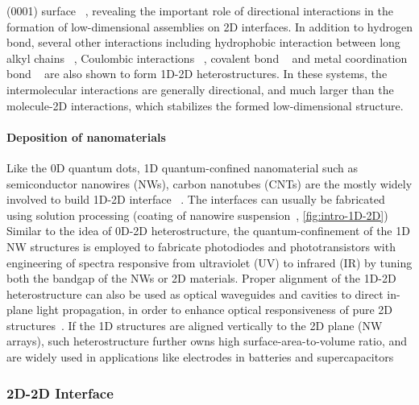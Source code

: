 (0001) surface
~\autocite{Meier_2010_polycyclic_gr,Roos_2011_BTP_gr,Roos_2011_hiera_org_gr},
revealing the important role of directional interactions in the
formation of low-dimensional assemblies on 2D
interfaces.
%
In addition to hydrogen bond, several other interactions including
hydrophobic interaction between long alkyl chains
~\autocite{De_Feyter_2003_2D_assem_rev, Deshpande_2012_1D_assemb_gr},
Coulombic interactions ~\autocite{Prado_2011_2D_acid_gr}, covalent bond
~\autocite{Colson_2011_2DMOF_gr,Colson_2014_2D_COF_gr} and metal
coordination bond ~\autocite{Urgel_2015_MOF_BN} are also shown to form
1D-2D heterostructures. In these systems, the intermolecular
interactions are generally directional, and much larger than the molecule-2D
interactions, which stabilizes the formed low-dimensional structure.

\paragraph{Deposition of nano\-materials}
Like the 0D quantum dots, 1D quantum-confined nano\-material such as
semiconductor nanowires (NWs), carbon nano\-tubes (CNTs) are the
mostly widely involved to build 1D-2D interface
~\autocite{Jariwala_2013_CNT-mos2,Jariwala_2014_solution_CNT,Fu_2012_gr_ZnONW,Wu_2010_NW_supercap,Gan_2013_Si_WG}.
%
The interfaces can usually be fabricated using solution processing
(\eg coating of nanowire suspension~\autocite{Jariwala_2014_solution_CNT},
\autoref{fig:intro-1D-2D})
%
Similar to the idea of 0D-2D heterostructure, the quantum-confinement
of the 1D NW structures is employed to fabricate photo\-diodes and
photo\-transistors with engineering of spectra responsive from
ultraviolet (UV) to infrared (IR) \autocite{Nie_2013_NW_array,Gao_2013_NW_gr,Miao_2014_NW_IR,Jariwala_2013_CNT-mos2,Spina_2015_perov_nw}
by tuning both the bandgap of the NWs or 2D materials.
%
Proper alignment of the 1D-2D heterostructure can also be used as
optical waveguides and cavities to direct in-plane light propagation,
in order to enhance optical responsiveness of pure 2D structures~\autocite{Gan_2013_Si_WG,Pospischil_2013_CMOS}.
%
If the 1D structures are aligned vertically to the 2D plane (\ie NW
arrays), such heterostructure further owns high surface-area-to-volume
ratio, and are widely used in applications like electrodes in
batteries and super\-capacitors \autocite{Wu_2010_NW_supercap,Liu_2011_V2O5NW}


\subsubsection{2D-2D Interface}
\label{sec:intro-2D-2D}

